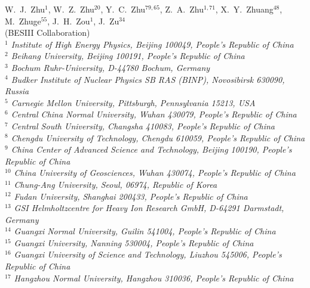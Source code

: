 {W.~J.~Zhu$^{1}$,
W.~Z.~Zhu$^{20}$,
Y.~C.~Zhu$^{79,65}$,
Z.~A.~Zhu$^{1,71}$,
X.~Y.~Zhuang$^{48}$,
M.~Zhuge$^{55}$,
J.~H.~Zou$^{1}$,
J.~Zu$^{34}$
\\
\vspace{0.2cm}
(BESIII Collaboration)\\
\vspace{0.2cm} {\it
$^{1}$ Institute of High Energy Physics, Beijing 100049, People's Republic of China\\
$^{2}$ Beihang University, Beijing 100191, People's Republic of China\\
$^{3}$ Bochum Ruhr-University, D-44780 Bochum, Germany\\
$^{4}$ Budker Institute of Nuclear Physics SB RAS (BINP), Novosibirsk 630090, Russia\\
$^{5}$ Carnegie Mellon University, Pittsburgh, Pennsylvania 15213, USA\\
$^{6}$ Central China Normal University, Wuhan 430079, People's Republic of China\\
$^{7}$ Central South University, Changsha 410083, People's Republic of China\\
$^{8}$ Chengdu University of Technology, Chengdu 610059, People's Republic of China\\
$^{9}$ China Center of Advanced Science and Technology, Beijing 100190, People's Republic of China\\
$^{10}$ China University of Geosciences, Wuhan 430074, People's Republic of China\\
$^{11}$ Chung-Ang University, Seoul, 06974, Republic of Korea\\
$^{12}$ Fudan University, Shanghai 200433, People's Republic of China\\
$^{13}$ GSI Helmholtzcentre for Heavy Ion Research GmbH, D-64291 Darmstadt, Germany\\
$^{14}$ Guangxi Normal University, Guilin 541004, People's Republic of China\\
$^{15}$ Guangxi University, Nanning 530004, People's Republic of China\\
$^{16}$ Guangxi University of Science and Technology, Liuzhou 545006, People's Republic of China\\
$^{17}$ Hangzhou Normal University, Hangzhou 310036, People's Republic of China\\
}}
